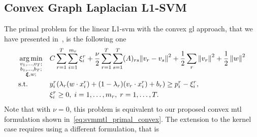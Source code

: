 \subsection{Convex Graph Laplacian L1-SVM}
%
The primal problem for the linear L1-\acrshort{svm} with the convex \acrshort{gl} approach, that we have presented in~\citep*{RuizAD20}, is the following one
%
\begin{equation}\label{eq:primal_cvxgl_l1_linear}
    \begin{aligned}
         & \argmin_{\substack{v_1, \ldots, v_\ntasks ;                                                                                                                                                                                                                                                                                          \\ \substack{b_1, \ldots, b_\ntasks } ; \\ \substack{\fv{\xi}}, w; }}
         &                                             & { C \sum_{r=1}^\ntasks \sum_{i=1}^{\npertask_r} {\xi_i^r}  + \frac{\nu}{2} \sum_{r=1}^\ntasks \sum_{s=1}^T (A)_{rs} {\| {v}_r - {v}_s \|}^2 + \frac{1}{2} \sum_r \norm{{v}_r}^2 + \frac{1}{2} \norm{{w}}^2}                                                                              \\
         & \text{s.t.}
         &                                             & y_i^r (\lambda_r ({w} \cdot {x}_i^r) + (1 - \lambda_r) ({v}_r \cdot {x}_i^r) + b_r) \geq p_i^r - \xi_i^r  ,                                                                                                                                                                            \\
         &                                             &                                                                                                                                                                                                           & \xi_i^r \geq 0,  \;  i = 1, \dotsc, \npertask_r, \; r=1, \dotsc, \ntasks .
    \end{aligned}
\end{equation}
%
Note that with $\nu=0$, this problem is equivalent to our proposed convex \acrshort{mtl} formulation shown in~\eqref{eq:svmmtl_primal_convex}.
%
The extension to the kernel case requires using a different formulation, that is
